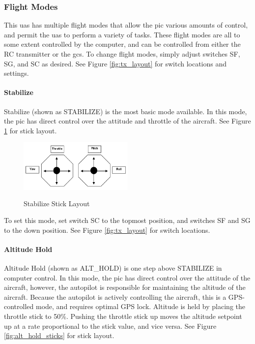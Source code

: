 \documentclass{report}
\begin{document}
			\subsubsection{Flight Modes}
				This \gls{uas} has multiple flight modes that allow the \gls{pic} various amounts of control, and permit the \gls{uas} to perform a variety of tasks.  These flight modes are all to some extent controlled by the computer, and can be controlled from either the RC transmitter or the \gls{gcs}.  To change flight modes, simply adjust switches SF, SG, and SC as desired.  See Figure \ref{fig:tx_layout} for switch locations and settings.
				\paragraph{Stabilize}
					Stabilize (shown as STABILIZE) is the most basic mode available.  In this mode, the \gls{pic} has direct control over the attitude and throttle of the aircraft. See Figure \ref{fig:stabilize_sticks} for stick layout.

					\begin{figure}[ht]
						\centering
						\caption{Stabilize Stick Layout}
						\includegraphics[width=0.5\textwidth]{stabilize_stick_layout.png}
						\label{fig:stabilize_sticks}
					\end{figure}

					To set this mode, set switch SC to the topmost position, and switches SF and SG to the down position.  See Figure \ref{fig:tx_layout} for switch locations.
				\paragraph{Altitude Hold}
					Altitude Hold (shown as ALT\_HOLD) is one step above STABILIZE in computer control.  In this mode, the \gls{pic} has direct control over the attitude of the aircraft, however, the autopilot is responsible for maintaining the altitude of the aircraft.  Because the autopilot is actively controlling the aircraft, this is a GPS-controlled mode, and requires optimal GPS lock.  Altitude is held by placing the throttle stick to 50\%.  Pushing the throttle stick up moves the altitude setpoint up at a rate proportional to the stick value, and vice versa.  See Figure \ref{fig:alt_hold_sticks} for stick layout.
\end{document}
